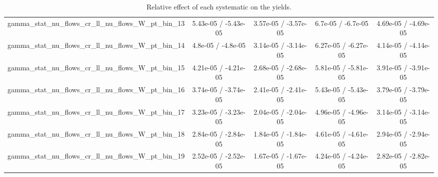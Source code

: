 \documentclass[10pt]{article}
\begin{document}
\begin{table}[htbp]
\begin{center}
\begin{tabular}{|c|c|c|c|c|}
  gamma_stat_nu_flows_cr_ll_nu_flows_W_pt_bin_13 & 5.43e-05 / -5.43e-05 & 3.57e-05 / -3.57e-05 & 6.7e-05 / -6.7e-05 & 4.69e-05 / -4.69e-05 \\ 
  gamma_stat_nu_flows_cr_ll_nu_flows_W_pt_bin_14 & 4.8e-05 / -4.8e-05 & 3.14e-05 / -3.14e-05 & 6.27e-05 / -6.27e-05 & 4.14e-05 / -4.14e-05 \\ 
  gamma_stat_nu_flows_cr_ll_nu_flows_W_pt_bin_15 & 4.21e-05 / -4.21e-05 & 2.68e-05 / -2.68e-05 & 5.81e-05 / -5.81e-05 & 3.91e-05 / -3.91e-05 \\ 
  gamma_stat_nu_flows_cr_ll_nu_flows_W_pt_bin_16 & 3.74e-05 / -3.74e-05 & 2.41e-05 / -2.41e-05 & 5.43e-05 / -5.43e-05 & 3.79e-05 / -3.79e-05 \\ 
  gamma_stat_nu_flows_cr_ll_nu_flows_W_pt_bin_17 & 3.23e-05 / -3.23e-05 & 2.04e-05 / -2.04e-05 & 4.96e-05 / -4.96e-05 & 3.14e-05 / -3.14e-05 \\ 
  gamma_stat_nu_flows_cr_ll_nu_flows_W_pt_bin_18 & 2.84e-05 / -2.84e-05 & 1.84e-05 / -1.84e-05 & 4.61e-05 / -4.61e-05 & 2.94e-05 / -2.94e-05 \\ 
  gamma_stat_nu_flows_cr_ll_nu_flows_W_pt_bin_19 & 2.52e-05 / -2.52e-05 & 1.67e-05 / -1.67e-05 & 4.24e-05 / -4.24e-05 & 2.82e-05 / -2.82e-05 \\ 
\hline 
\end{tabular} 
\caption{Relative effect of each systematic on the yields.} 
\end{center} 
\end{table} 
\end{document}
